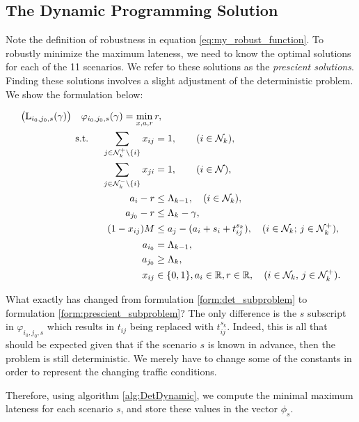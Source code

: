 \subsection{The Dynamic Programming Solution}
Note the definition of robustness in equation \ref{eq:my_robust_function}. To robustly minimize the maximum lateness, we need to know the optimal solutions for each of the 11 scenarios. We refer to these solutions as the \textit{prescient solutions}. Finding these solutions involves a slight adjustment of the deterministic problem. We show the formulation below:

\begin{align}
\label{form:prescient_subproblem}
\begin{split}
\bigl(\operatorname{L}_{i_0,j_0, s}(\gamma)\bigr)\quad
\varphi_{i_0,j_0, s}(\gamma)=\min_{x,a,r}\,&r,\\
\text{s.t. }\quad \sum_{j\in{\mathcal N}_{k}^+\setminus\{i\}} x_{ij}&=1,\qquad (i\in{\mathcal N}_k),\\
\sum_{j\in{\mathcal N}_{k}^-\setminus\{i\}} x_{ji}&=1,\qquad(i\in{\mathcal N}),\\
a_i-r&\leq \Lambda_{k-1},\quad(i\in{\mathcal N}_k),\\
a_{j_0} -r& \leq \Lambda_k - \gamma, \\
(1-x_{ij})M&\leq a_j - (a_i+s_i+t^{s_k}_{ij}),\quad(i\in{\mathcal N}_k;\,j\in{\mathcal N}_k^+),\\
a_{i_0}&=\Lambda_{k-1},\\
a_{j_0}&\geq \Lambda_{k},\\
x_{ij}&\in\{0,1\},  a_i\in\mathbb{R}, r\in\mathbb{R},\quad(i\in{\mathcal N}_k,\,j\in{\mathcal N}_k^+).
\end{split}
\end{align}

What exactly has changed from formulation \ref{form:det_subproblem} to formulation \ref{form:prescient_subproblem}? The only difference is the $s$ subscript in $\varphi_{i_0, j_0, s}$ which results in $t_{ij}$ being replaced with $t^{s_k}_{ij}$. Indeed, this is all that should be expected given that if the scenario $s$ is known in advance, then the problem is still deterministic. We merely have to change some of the constants in order to represent the changing traffic conditions.

Therefore, using algorithm \ref{alg:DetDynamic}, we compute the minimal maximum lateness for each scenario $s$, and store these values in the vector $\phi_s$. 


